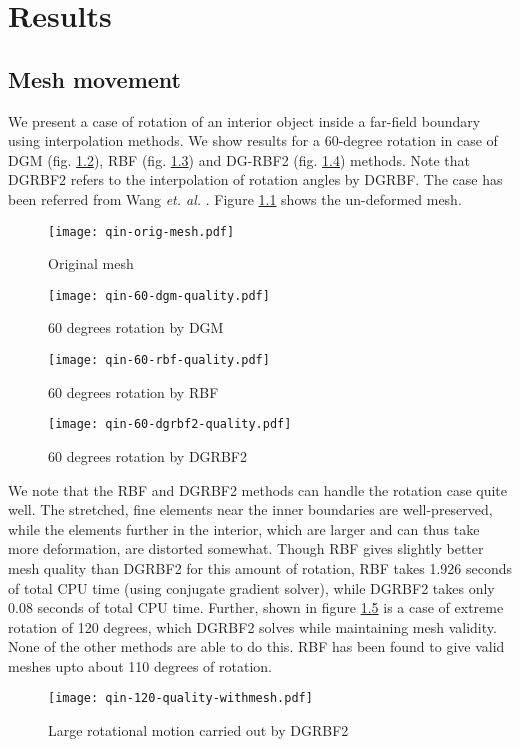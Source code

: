  \chapter{Results}
 
 \section{Mesh movement}
 
 We present a case of rotation of an interior object inside a far-field boundary using interpolation methods. We show results for a 60-degree rotation in case of DGM (fig. \ref{fig:qin-60-dgm}), RBF (fig. \ref{fig:qin-60-rbf}) and DG-RBF2 (fig. \ref{fig:qin-60-dgrbf2}) methods. Note that DGRBF2 refers to the interpolation of rotation angles by DGRBF. The case has been referred from Wang \emph{et. al.} \cite{mm:dgrbf}. Figure \ref{fig:qin-orig} shows the un-deformed mesh.
 
 \begin{figure}
 	\centering
 	\texttt{[image: qin-orig-mesh.pdf]}
 	\caption{Original mesh}
 	\label{fig:qin-orig}
 \end{figure}
 
 \begin{figure}
 	\centering
 	\texttt{[image: qin-60-dgm-quality.pdf]}
 	\caption{60 degrees rotation by DGM}
 	\label{fig:qin-60-dgm}
 \end{figure}
 
 \begin{figure}
 	\centering
 	\texttt{[image: qin-60-rbf-quality.pdf]}
 	\caption{60 degrees rotation by RBF}
 	\label{fig:qin-60-rbf}
 \end{figure}
 
 \begin{figure}
 	\centering
 	\texttt{[image: qin-60-dgrbf2-quality.pdf]}
 	\caption{60 degrees rotation by DGRBF2}
 	\label{fig:qin-60-dgrbf2}
 \end{figure}
 
 We note that the RBF and DGRBF2 methods can handle the rotation case quite well. The stretched, fine elements near the inner boundaries are well-preserved, while the elements further in the interior, which are larger and can thus take more deformation, are distorted somewhat. Though RBF gives slightly better mesh quality than DGRBF2 for this amount of rotation, RBF takes 1.926 seconds of total CPU time (using conjugate gradient solver), while DGRBF2 takes only 0.08 seconds of total CPU time. Further, shown in figure \ref{fig:qin-dgrbf2-120} is a case of extreme rotation of 120 degrees, which DGRBF2 solves while maintaining mesh validity. None of the other methods are able to do this. RBF has been found to give valid meshes upto about 110 degrees of rotation.
 \begin{figure}
 	\centering
 	\texttt{[image: qin-120-quality-withmesh.pdf]}
 	\caption{Large rotational motion carried out by DGRBF2}
 	\label{fig:qin-dgrbf2-120}
 \end{figure}
 
